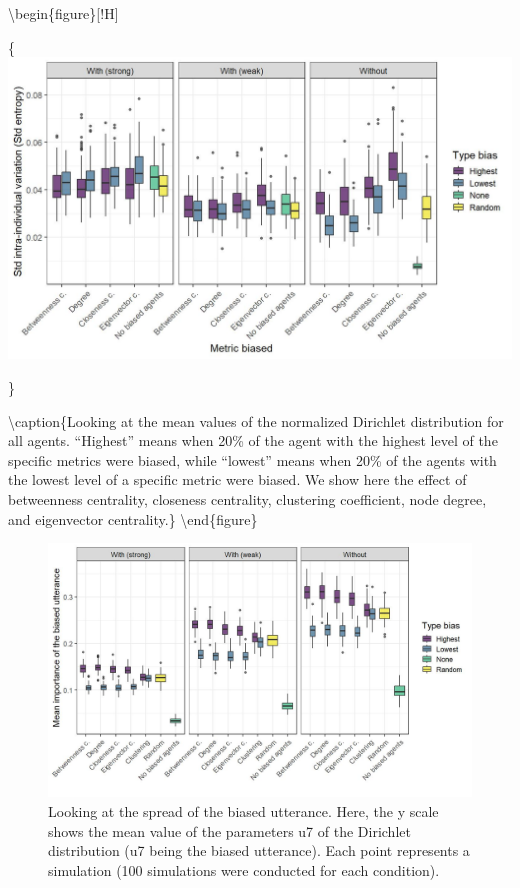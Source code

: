 \documentclass[
]{article}
\begin{document}
\textbackslash begin\{figure\}{[}!H{]}

\{\centering \includegraphics{./Figures/unnamed-chunk-217-1}

\}

\textbackslash caption\{Looking at the mean values of the normalized
Dirichlet distribution for all agents. ``Highest'' means when 20\% of
the agent with the highest level of the specific metrics were biased,
while ``lowest'' means when 20\% of the agents with the lowest level of
a specific metric were biased. We show here the effect of betweenness
centrality, closeness centrality, clustering coefficient, node degree,
and eigenvector centrality.\}\label{fig:unnamed-chunk-217}
\textbackslash end\{figure\}

\begin{figure}[!H]

{\centering \includegraphics{./Figures/unnamed-chunk-218-1} 

}

\caption{Looking at the spread of the biased utterance. Here, the y scale shows the mean value of the parameters u7 of the Dirichlet distribution (u7 being the biased utterance). Each point represents a simulation (100 simulations were conducted for each condition). }\label{fig:unnamed-chunk-218}
\end{figure}
\end{document}
